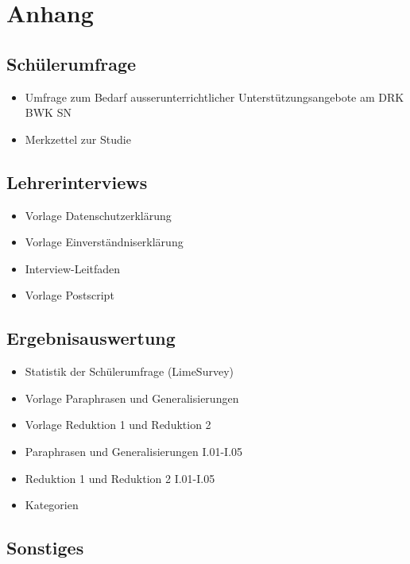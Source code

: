 \listoffigures

\section{Anhang}
\label{sec:Anhang}

\subsection{Schülerumfrage}
\label{sec:Schülerumfrage}

\begin{itemize}
	\item Umfrage zum Bedarf ausserunterrichtlicher Unterstützungsangebote am DRK BWK SN 
	\item Merkzettel zur Studie 
\end{itemize}

\subsection{Lehrerinterviews}
\label{sec:Lehrerinterviews}

\begin{itemize}
	\item Vorlage Datenschutzerklärung
	\item Vorlage Einverständniserklärung 
	\item Interview-Leitfaden 
	\item Vorlage Postscript
\end{itemize}

\subsection{Ergebnisauswertung}
\label{sec:Ergebnisauswertung}

	\begin{itemize}
	\item Statistik der Schülerumfrage (LimeSurvey)
	\item Vorlage Paraphrasen und Generalisierungen
	\item Vorlage Reduktion 1 und Reduktion 2
	\item Paraphrasen und Generalisierungen I.01-I.05
	\item Reduktion 1 und Reduktion 2 I.01-I.05
	\item Kategorien
	\end{itemize}

\subsection{Sonstiges}
\label{sec:Sonstiges}

